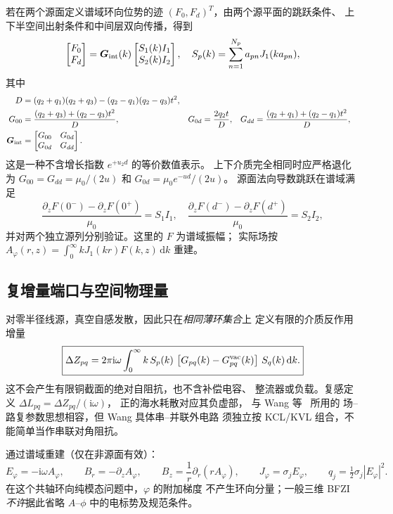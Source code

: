 若在两个源面定义谱域环向位势的迹
$(F_0,F_d)^T$，由两个源平面的跳跃条件、
上下半空间出射条件和中间层双向传播，得到
\begin{equation}
\begin{bmatrix}F_0\\F_d\end{bmatrix}
=\bm G_{\rm int}(k)
\begin{bmatrix}S_1(k)I_1\\S_2(k)I_2\end{bmatrix},
\quad
S_p(k)=\sum_{n=1}^{N_p}a_{pn}J_1(ka_{pn}),
\end{equation}
其中
\begin{align}
D &= (q_2+q_1)(q_2+q_3)-(q_2-q_1)(q_2-q_3)t^2,\\
G_{00} &=\frac{(q_2+q_3)+(q_2-q_3)t^2}{D},&
G_{0d}&=\frac{2q_2t}{D},&
G_{dd}&=\frac{(q_2+q_1)+(q_2-q_1)t^2}{D},\\
\bm G_{\rm int}&=
\begin{bmatrix}G_{00}&G_{0d}\\G_{0d}&G_{dd}\end{bmatrix}.
\end{align}
这是一种不含增长指数 $e^{+u_2d}$ 的等价数值表示。
上下介质完全相同时应严格退化为
$G_{00}=G_{dd}=\mu_0/(2u)$ 和
$G_{0d}=\mu_0 e^{-ud}/(2u)$。
源面法向导数跳跃在谱域满足
\begin{equation}
\frac{\partial_zF(0^-)-\partial_zF(0^+)}{\mu_0}=S_1I_1,\quad
\frac{\partial_zF(d^-)-\partial_zF(d^+)}{\mu_0}=S_2I_2,
\end{equation}
并对两个独立源列分别验证。这里的 $F$ 为谱域振幅；
实际场按 $A_\varphi(r,z)=\int_0^\infty
 kJ_1(kr)F(k,z)\,\mathrm dk$ 重建。

\subsection{复增量端口与空间物理量}
对零半径线源，真空自感发散，因此只在\emph{相同薄环集合}上
定义有限的介质反作用增量
\begin{equation}
\boxed{
\Delta Z_{pq}
= 2\pi\mathrm i\omega
\int_0^\infty k\, S_p(k)\,
\left[G_{pq}(k)-G^{\rm vac}_{pq}(k)\right]\,
S_q(k)\,\mathrm dk.}
\end{equation}
这不会产生有限铜截面的绝对自阻抗，也不含补偿电容、
整流器或负载。复感定义
$\Delta L_{pq}=\Delta Z_{pq}/(\mathrm i\omega)$，
正的海水耗散对应其负虚部，
与 Wang 等~\cite{wang2025marinewpt} 所用的
场--路复参数思想相容，但 Wang 具体串--并联外电路
须独立按 KCL/KVL 组合，不能简单当作串联对角阻抗。

通过谱域重建（仅在非源面有效）：
\begin{equation}
E_\varphi=-\mathrm i\omega A_\varphi,\qquad
B_r=-\partial_z A_\varphi,\qquad
B_z=\frac1r\partial_r(rA_\varphi),\qquad
J_\varphi=\sigma_j E_\varphi,\qquad
q_j=\tfrac12\sigma_j|E_\varphi|^2.
\end{equation}
在这个共轴环向纯模态问题中，$\varphi$ 的附加梯度
不产生环向分量；一般三维 BFZI \emph{不许}据此省略
$A$--$\phi$ 中的电标势及规范条件。

